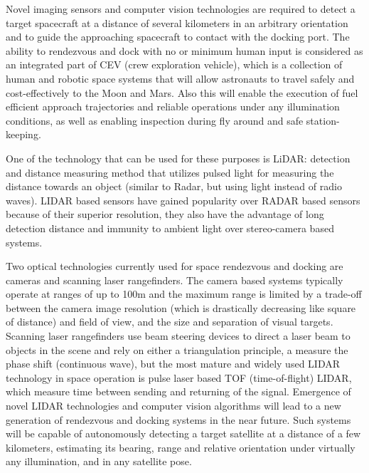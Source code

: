 Novel imaging sensors and computer vision technologies are required to detect a target spacecraft at a distance of several kilometers in an arbitrary orientation and to guide the approaching spacecraft to contact with the docking port. 
The ability to rendezvous and dock with no or minimum human input is considered as an integrated part of CEV (crew exploration vehicle),
which is a collection of human and robotic space systems that will allow astronauts to travel safely and cost-effectively to the Moon and Mars.
Also  this will enable the execution of fuel efficient approach trajectories and reliable operations under any illumination conditions,
as well as enabling inspection during fly around and safe station-keeping.

One of the technology that can be used for these purposes is LiDAR: detection and distance measuring method that utilizes pulsed light for measuring the distance towards an object (similar to Radar, but using light instead of radio waves).
LIDAR based sensors have gained popularity over RADAR based sensors because of their superior resolution, they also
have the advantage of long detection distance and immunity to ambient light over stereo-camera based systems.

Two optical technologies currently used for space rendezvous and docking are cameras and scanning laser rangefinders.
The camera based systems typically operate at ranges of up to 100m and the maximum range is limited by a trade-off between
the camera image resolution (which is drastically decreasing like square of distance) and field of view, and the size and separation of visual targets.
Scanning laser rangefinders use beam steering devices to direct a laser beam to objects in the scene and rely on either a triangulation principle,
a measure the phase shift (continuous wave), but the most mature and widely used LIDAR technology in space operation is pulse laser based TOF (time-of-flight) LIDAR,
which measure time between sending and returning of the signal.
Emergence of novel LIDAR technologies and computer vision algorithms will lead to a new generation of rendezvous and docking systems in the near future.
Such systems will be capable of autonomously detecting a target satellite at a distance of a few kilometers, estimating its bearing, range and relative orientation under virtually any illumination, and in any satellite pose.

